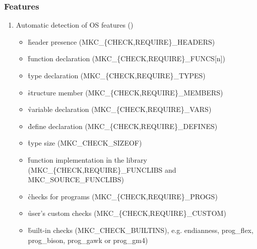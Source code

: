 \documentclass[hyperref={colorlinks=true}]{beamer}
\begin{document}
\begin{frame}[fragile]
  \frametitle{Features}
  \begin{block}{}
  \begin{enumerate}
  \item Automatic detection of OS features
    ()
    \begin{itemize}
    \item \h{header presence} (MKC\_\{CHECK,REQUIRE\}\_HEADERS)
    \item \h{function declaration} (MKC\_\{CHECK,REQUIRE\}\_FUNCS[n])
    \item \h{type declaration} (MKC\_\{CHECK,REQUIRE\}\_TYPES)
    \item \h{structure member} (MKC\_\{CHECK,REQUIRE\}\_MEMBERS)
    \item \h{variable declaration} (MKC\_\{CHECK,REQUIRE\}\_VARS)
    \item \h{define declaration} (MKC\_\{CHECK,REQUIRE\}\_DEFINES)
    \item \h{type size} (MKC\_CHECK\_SIZEOF)
    \item \h{function} implementation \h{in the library}
      (MKC\_\{CHECK,REQUIRE\}\_FUNCLIBS and MKC\_SOURCE\_FUNCLIBS)
    \item \h{checks for programs} (MKC\_\{CHECK,REQUIRE\}\_PROGS)
    \item \h{user's custom checks} (MKC\_\{CHECK,REQUIRE\}\_CUSTOM)
    \item \h{built-in checks} (MKC\_CHECK\_BUILTINS), e.g. endianness,
      prog\_flex, prog\_bison, prog\_gawk or prog\_gm4)
    \end{itemize}
  \end{enumerate}
  \end{block}
\end{frame}
\end{document}

